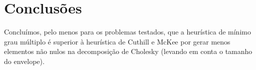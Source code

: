 \section{Conclusões}
Concluímos, pelo menos para os problemas testados, que a heurística de mínimo
grau múltiplo é superior à heurística de Cuthill e McKee por gerar menos
elementos não nulos na decomposição de Cholesky (levando em conta o tamanho do
envelope).
